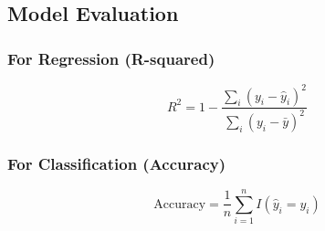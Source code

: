 \documentclass{article}
\begin{document}
\subsection{Model Evaluation}

\subsubsection{For Regression (R-squared)}
\begin{equation}
    R^2 = 1 - \frac{\sum_i (y_i - \hat{y}_i)^2}{\sum_i (y_i - \bar{y})^2}
\end{equation}

\subsubsection{For Classification (Accuracy)}
\begin{equation}
    \text{Accuracy} = \frac{1}{n} \sum_{i=1}^n I(\hat{y}_i = y_i)
\end{equation}
\end{document}
